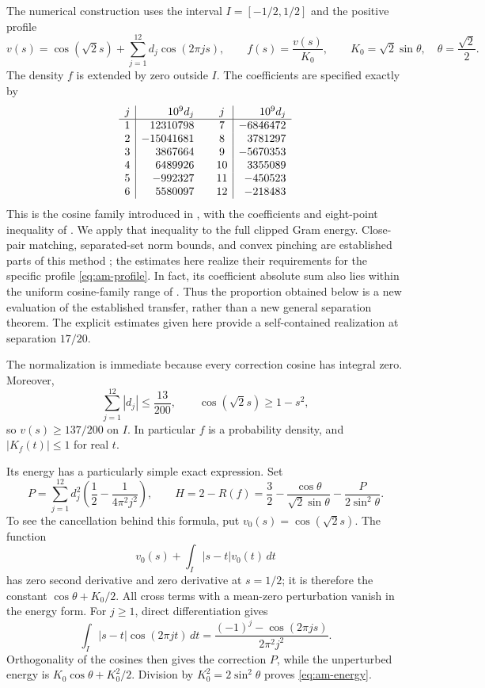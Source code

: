 \documentclass[11pt,reqno]{amsart}
\numberwithin{equation}{section}
\begin{document}
The numerical construction uses the interval $I=[-1/2,1/2]$ and the
positive profile
\begin{equation}
 v(s)=\cos(\sqrt2s)+\sum_{j=1}^{12}d_j\cos(2\pi js),\qquad
 f(s)=\frac{v(s)}{K_0},\qquad
 K_0=\sqrt2\sin\theta,\quad \theta=\frac{\sqrt2}{2}.
 \label{eq:am-profile}
\end{equation}
The density $f$ is extended by zero outside $I$. The coefficients are
specified exactly by
\[
\begin{array}{c|r@{\qquad}c|r}
j&10^9d_j&j&10^9d_j\\\hline
1&12310798&7&-6846472\\
2&-15041681&8&3781297\\
3&3867664&9&-5670353\\
4&6489926&10&3355089\\
5&-992327&11&-450523\\
6&5580097&12&-218483
\end{array}
\]
This is the cosine family introduced in \cite{AMTOPA}, with the
coefficients and eight-point inequality of \cite{Lavery2026}.
We apply that inequality to the full clipped Gram energy. Close-pair matching, separated-set norm
bounds, and convex pinching are established parts of this method
\cite{Freund,Knausgard2026}; the estimates here realize their requirements
for the specific profile \eqref{eq:am-profile}. In fact, its coefficient
absolute sum also lies within the uniform cosine-family range of
\cite[Section 3]{Freund}. Thus the proportion obtained below is a new
evaluation of the established transfer, rather than a new general
separation theorem. The explicit estimates given here provide a
self-contained realization at separation $17/20$.

The normalization is immediate because every correction cosine has
integral zero. Moreover,
\[
 \sum_{j=1}^{12}|d_j|\le\frac{13}{200},\qquad
 \cos(\sqrt2s)\ge1-s^2,
\]
so $v(s)\ge137/200$ on $I$. In particular $f$ is a probability
density, and $|K_f(t)|\le1$ for real $t$.

Its energy has a particularly simple exact expression. Set
\begin{equation}
 P=\sum_{j=1}^{12}d_j^2
       \left(\frac12-\frac1{4\pi^2j^2}\right),\qquad
 H=2-R(f)
  =\frac32-\frac{\cos\theta}{\sqrt2\sin\theta}
       -\frac{P}{2\sin^2\theta}.
 \label{eq:am-energy}
\end{equation}
To see the cancellation behind this formula, put
$v_0(s)=\cos(\sqrt2s)$. The function
\[
 v_0(s)+\int_I|s-t|v_0(t)\,dt
\]
has zero second derivative and zero derivative at $s=1/2$; it is
therefore the constant $\cos\theta+K_0/2$. All cross terms with a
mean-zero perturbation vanish in the energy form. For $j\ge1$, direct
differentiation gives
\[
 \int_I|s-t|\cos(2\pi jt)\,dt
   =\frac{(-1)^j-\cos(2\pi js)}{2\pi^2j^2}.
\]
Orthogonality of the cosines then gives the correction $P$, while
the unperturbed energy is $K_0\cos\theta+K_0^2/2$. Division by
$K_0^2=2\sin^2\theta$ proves \eqref{eq:am-energy}.
\end{document}

